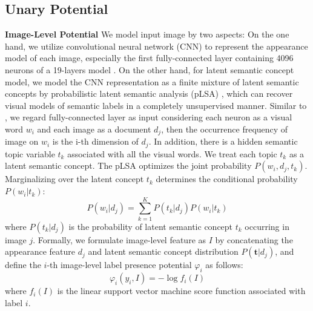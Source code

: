 \subsection{Unary Potential}
\textbf{Image-Level Potential}
We model input image by two aspects: On the one hand, we utilize convolutional neural network (CNN) to represent the appearance model of each image, especially the first fully-connected layer containing 4096 neurons of a 19-layers model \cite{simonyan2014very}.
On the other hand, for latent semantic concept model, we model the CNN representation as a finite mixture of latent semantic concepts by probabilistic latent semantic analysis (pLSA) \cite{sivic2005discovering}, which can recover visual models of semantic labels in a completely unsupervised manner.
Similar to \cite{wang2014weakly}, we regard fully-connected layer as input considering each neuron as a visual word $w_i$ and each image as a document $d_j$, then the occurrence frequency of image on $w_i$ is the i-th dimension of $d_j$.
In addition, there is a hidden semantic topic variable $t_k$ associated with all the visual words.
We treat each topic $t_k$ as a latent semantic concept. The pLSA optimizes the joint probability $P(w_i,d_j,t_k)$.
Marginalizing over the latent concept $t_k$ determines the conditional probability $P(w_i|t_k)$:
\begin{equation}
  P(w_i|d_j) = \sum_{k=1}^K{P(t_k|d_j)P(w_i|t_k)}
\end{equation}
where $P(t_k|d_j)$ is the probability of latent semantic concept $t_k$ occurring in image $j$.
Formally, we formulate image-level feature as $I$ by concatenating the appearance feature $d_j$ and latent semantic concept distribution $P(\boldsymbol{t}|d_j)$, and define the $i$-th image-level label presence potential $\varphi_{i}$ as follows:
\begin{equation}
    \varphi_{i}(y_i,I) = -\log f_{i}(I)
    \label{eq:global}
\end{equation}
where $f_{i}(I)$ is the linear support vector machine score function associated with label $i$.

